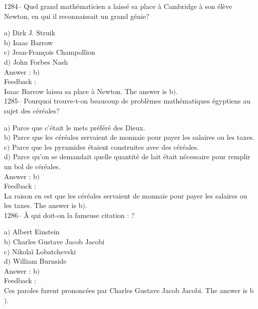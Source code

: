 ﻿\documentclass[letterpaper, 12pt]{article}
\begin{document}
1284-- Quel grand math\'ematicien a laiss\'e sa place \`a Cambridge
\`a son \'el\`eve Newton, en qui il reconnaissait un grand g\'enie?

a$)$ Dirk J. Struik \\
b$)$ Isaac Barrow \\
c$)$ Jean-Fran\c cois Champollion \\
d$)$ John Forbes Nash\\

Answer : b$)$\\

Feedback : \\
Isaac Barrow laissa sa place \`a Newton.
The answer is  b$)$.\\

1285-- Pourquoi trouve-t-on beaucoup de probl\`emes math\'ematiques
\'egyptiens au sujet des c\'er\'eales?

a$)$ Parce que c'\'etait le mets pr\'ef\'er\'e des Dieux. \\
b$)$ Parce que les c\'er\'eales servaient de monnaie pour payer les salaires
ou les taxes. \\
c$)$ Parce que les pyramides \'etaient construites avec des c\'er\'eales. \\
d$)$ Parce qu'on se demandait quelle quantit\'e de lait \'etait n\'ecessaire
pour remplir un bol de c\'er\'eales. \\


Answer : b$)$\\

Feedback : \\
La raison en est que les c\'er\'eales servaient de monnaie pour
payer les salaires ou les taxes.
The answer is  b$)$.\\

1286-- \`A qui doit-on la fameuse citation : \fg?

a$)$ Albert Einstein \\
b$)$ Charles Gustave Jacob Jacobi \\
c$)$ Nikola\"i Lobatchevski \\
d$)$ William Burnside\\

Answer : b$)$\\

Feedback : \\
Ces paroles furent prononc\'ees par Charles Gustave Jacob Jacobi.
The answer is  b$)$.\\
\end{document}
